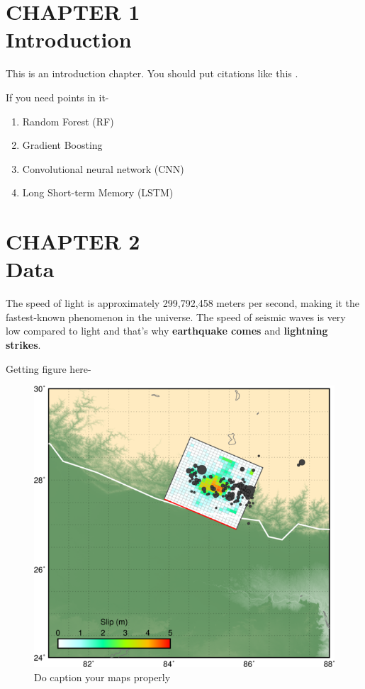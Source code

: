 \documentclass[12pt]{article}
\begin{document}
\newpage
\section*{CHAPTER 1 \\Introduction}

This is an introduction chapter. You should put citations like this \citep{Zhang2011}.

If you need points in it- 

\begin{enumerate}
    \item Random Forest (RF)
    \item  Gradient Boosting
    \item Convolutional neural network (CNN)
    \item Long Short-term Memory (LSTM)

\end{enumerate}


\newpage
\section*{CHAPTER 2\\Data}
The speed of light is approximately 299,792,458 meters per second, making it the fastest-known phenomenon in the universe. The speed of seismic waves is very low compared to light and that's why \textbf{earthquake comes} and \textbf{lightning strikes}.

Getting figure here- 

\begin{figure}[H]
    \centering
    \includegraphics[width=\textwidth]{basemap.png}
    \caption{ Do caption your maps properly}
    \label{fig:well}
\end{figure}
\end{document}
